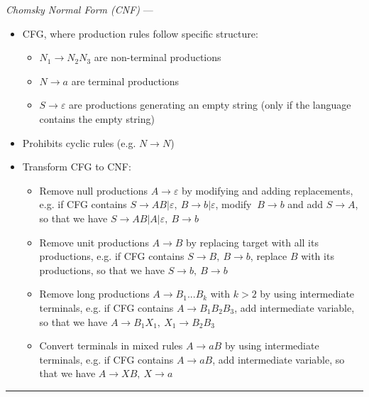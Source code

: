 \emph{Chomsky Normal Form (CNF)} ---
\begin{itemize}
    \item CFG, where production rules follow specific structure:
    \begin{itemize}
        \item $N_1 \to N_2 N_3$ are non-terminal productions
        \item $N \to a$ are terminal productions
        \item $S \to \varepsilon$ are productions generating an empty string (only if the language contains the empty string)
    \end{itemize}
    \item Prohibits cyclic rules (e.g. $N \to N$)
    \item Transform CFG to CNF:
    \begin{itemize}
        \item Remove null productions $A \to \varepsilon$ by modifying and adding replacements, e.g. if CFG contains $S \to AB | \varepsilon,\ B \to b|\varepsilon$, modify $\ B \to b$ and add $S \to A$, so that we have $S \to AB  | A | \varepsilon,\ B \to b$
        \item Remove unit productions $A \to B$ by replacing target with all its productions, e.g. if CFG contains $S \to B ,\ B \to b$, replace $B$ with its productions, so that we have $S \to b,\ B \to b$
        \item Remove long productions $A \to B_1...B_k$ with $k > 2$ by using intermediate terminals, e.g. if CFG contains $A \to B_1B_2B_3$, add intermediate variable, so that we have $A \to B_1X_1,\ X_1 \to B_2B_3$
        \item Convert terminals in mixed rules $A \to aB$ by using intermediate terminals, e.g. if CFG contains $A \to aB$, add intermediate variable, so that we have $A \to XB,\ X \to a$
    \end{itemize}
\end{itemize}

{\color{lightgray}\hrule height 0.001mm}

